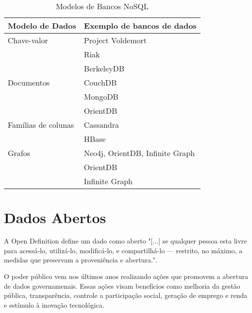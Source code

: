 \begin{table}[]
\centering
\caption{Modelos de Bancos NoSQL}
\label{tab:modelosnosql}
\begin{tabular}{ll}
\textbf{Modelo de Dados}     & \textbf{Exemplo de bancos de dados}      \\ \hline
Chave-valor         & Project Voldemort               \\
                    & Riak                            \\
                    & BerkeleyDB                      \\ \hline
Documentos          & CouchDB                         \\
                    & MongoDB                         \\
                    & OrientDB                        \\ \hline
Famílias de colunas & Cassandra                       \\
                    & HBase                           \\ \hline
Grafos              & Neo4j, OrientDB, Infinite Graph \\
                    & OrientDB                        \\
                    & Infinite Graph                 
\end{tabular}
\end{table}

\section{Dados Abertos}
A Open Definition define um dado como aberto "[...] se qualquer pessoa esta livre para acessá-lo, utilizá-lo, modificá-lo, e compartilhá-lo — restrito, no máximo, a medidas que preservam a proveniência e abertura."\cite{opendefinition}.

O poder público vem nos últimos anos realizando ações que promovem a abertura de dados governamenais. Essas ações visam benefícios como melhoria da gestão pública, transparência, controle a participação social, geração de emprego e renda e estímulo à inovação tecnológica. \cite{tcu}












